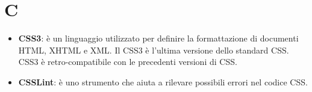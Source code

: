 \section{C}
\begin{itemize}
	\textbf{CSS}:(Cascading Style Sheets, in italiano fogli di stile a cascata), in informatica, è un linguaggio usato per definire la formattazione di documenti HTML, XHTML e XML ad esempio i siti web e relative pagine web.
	\item
	\textbf{CSS3}: è un linguaggio utilizzato per definire la formattazione di documenti HTML, XHTML e XML. Il CSS3 è l'ultima versione dello standard CSS. CSS3 è retro-compatibile con le precedenti versioni di CSS.

	\item
	\textbf{CSSLint}: è uno strumento che aiuta a rilevare possibili errori nel codice CSS.
\end{itemize}